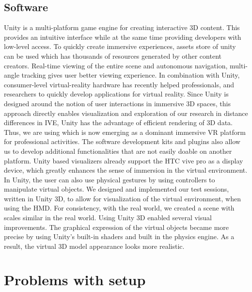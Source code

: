 \subsection{Software}
Unity is a multi-platform game engine for creating interactive 3D content. This provides an intuitive interface while at the same time providing developers with low-level access.        To quickly create immersive experiences, assets store of unity can be used which has thousands of resources generated by other content creators. Real-time viewing of the entire scene and autonomous navigation, multi-angle tracking gives user better viewing experience.
In combination with Unity, consumer-level virtual-reality hardware has recently helped professionals, and researchers to quickly develop applications for virtual reality.  
Since Unity is designed around the notion of user interactions in immersive 3D spaces, this approach directly enables visualization and exploration of our research in distance differences in IVE, Unity has the advantage of efficient rendering of 3D data. Thus, we are using which is now emerging as a dominant immersive VR platform for professional activities. The software development kits and plugins also allow us to develop additional functionalities that are not easily doable on another platform. Unity based visualizers already support the HTC vive pro as a display device, which greatly enhances the sense of immersion in the virtual environment. In Unity, the user can also use physical gestures by using controllers to manipulate virtual objects. 
We designed and implemented our test sessions, written in Unity 3D, to allow for visualization of the virtual environment, when using the HMD. For consistency, with the real world, we created a scene with scales similar in the real world. Using Unity 3D enabled several visual improvements. The graphical expression of the virtual objects became more precise by using Unity’s built-in shaders and built in the physics engine. As a result, the virtual 3D model appearance looks more realistic.


\section{Problems with setup}
